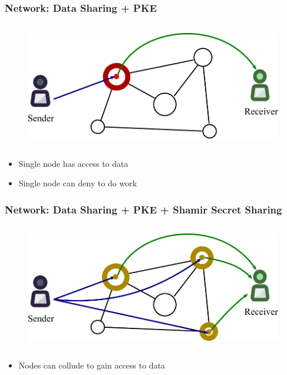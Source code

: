 \documentclass[xetex,mathsans,sans,aspectratio=169]{beamer}
\begin{document}
    \begin{frame}
        \frametitle{Network: Data Sharing + PKE}
        \begin{figure}
            \centering
            \includegraphics[height=5.5cm]{pdf/permissioned.pdf}
        \end{figure}
        \begin{itemize}
            \item Single node has access to data
            \item Single node can deny to do work
        \end{itemize}
    \end{frame}

    \begin{frame}
        \frametitle{Network: Data Sharing + PKE + Shamir Secret Sharing}
        \begin{figure}
            \centering
            \includegraphics[height=5.5cm]{pdf/permissioned-sss.pdf}
        \end{figure}
        \begin{itemize}
            \item Nodes can collude to gain access to data
        \end{itemize}
    \end{frame}
\end{document}
